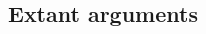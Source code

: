\documentclass[11pt]{article}
\begin{document}
\begin{multicols}{2}



\section{Extant arguments}


\end{multicols}
\end{document}
